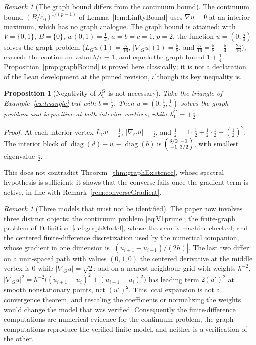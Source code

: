 \documentclass[11pt]{article}
\theoremstyle{plain}
\newtheorem{proposition}[theorem]{Proposition}
\theoremstyle{definition}
\theoremstyle{remark}
\newtheorem{remark}[theorem]{Remark}
\begin{document}
\begin{remark}[The graph bound differs from the continuum bound]\label{rem:graphBoundSharp}
The continuum bound \((B/c_0)^{1/(p-1)}\) of Lemma~\ref{lem:LinftyBound} uses \(\nabla u=0\) at an interior maximum, which has no graph analogue. The graph bound is attained: with \(V=\{0,1\}\), \(B=\{0\}\), \(w(0,1)=\tfrac14\), \(a=b=c=1\), \(p=2\), the function \(u=(0,\tfrac54)\) solves the graph problem (\(L_Gu(1)=\tfrac5{16}\), \(|\nabla_Gu|(1)=\tfrac58\), and \(\tfrac5{16}=\tfrac58+\tfrac54-\tfrac{25}{16}\)), exceeds the continuum value \(b/c=1\), and equals the graph bound \(1+\tfrac14\). Proposition~\ref{prop:graphBound} is proved here classically; it is not a declaration of the Lean development at the pinned revision, although its key inequality is.
\end{remark}

\begin{proposition}[Negativity of \(\lambda_1^G\) is not necessary]\label{prop:graphConverse}
Take the triangle of Example~\ref{ex:triangle} but with \(b=\tfrac12\). Then \(u=(0,\tfrac12,\tfrac12)\) solves the graph problem and is positive at both interior vertices, while \(\lambda_1^G=+\tfrac12\).
\end{proposition}
\begin{proof}
At each interior vertex \(L_Gu=\tfrac12\), \(|\nabla_Gu|=\tfrac12\), and \(\tfrac12=1\cdot\tfrac12+\tfrac12\cdot\tfrac12-(\tfrac12)^2\). The interior block of \(\operatorname{diag}(d)-w-\operatorname{diag}(b)\) is \(\begin{psmallmatrix}3/2&-1\\-1&3/2\end{psmallmatrix}\), with smallest eigenvalue \(\tfrac12\).
\end{proof}
This does not contradict Theorem~\ref{thm:graphExistence}, whose spectral hypothesis is sufficient; it shows that the converse fails once the gradient term is active, in line with Remark~\ref{rem:converseGradient}.

\begin{remark}[Three models that must not be identified]\label{rem:threeModels}
The paper now involves three distinct objects: the continuum problem \eqref{eq:V1prime}; the finite-graph problem of Definition~\ref{def:graphModel}, whose theorem is machine-checked; and the centered finite-difference discretization used by the numerical companion, whose gradient in one dimension is \(|(u_{i+1}-u_{i-1})/(2h)|\). The last two differ: on a unit-spaced path with values \((0,1,0)\) the centered derivative at the middle vertex is \(0\) while \(|\nabla_Gu|=\sqrt2\); and on a nearest-neighbour grid with weights \(h^{-2}\), \(|\nabla_Gu|^2=h^{-2}\big((u_{i+1}-u_i)^2+(u_{i-1}-u_i)^2\big)\) has leading term \(2(u')^2\) at smooth nonstationary points, not \((u')^2\). This local expansion is not a convergence theorem, and rescaling the coefficients or normalizing the weights would change the model that was verified. Consequently the finite-difference computations are numerical evidence for the continuum problem, the graph computations reproduce the verified finite model, and neither is a verification of the other.
\end{remark}
\end{document}
